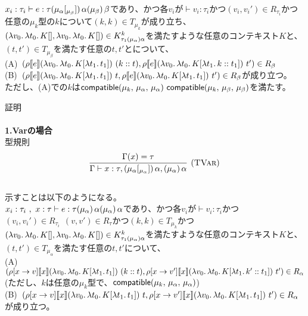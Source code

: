\setcounter{definition}{7}
\begin{theorem}
  $x_i:\tau_i \vdash e:\tau (\mu_{\alpha}\lbrack \tiny{_{\mu_{\beta}}} \rbrack)\,\alpha (\mu_{\beta})\,\beta$であり、かつ各$v_i$が$\vdash v_i:\tau_i$かつ$(v_i,v_i') \in R_{\tau_i}$かつ任意の$\mu_k$型の$k$について$(k,k)\in T_{\mu_k}$が成り立ち、$(\lambda{v_0}.\,{\lambda{t_0}.\,{K[]}}, \lambda{v_0}.\,{\lambda{t_0}.\,{K[]}})\in  K^k_{\tau_1(\mu_{\alpha})\alpha}$を満たすような任意のコンテキスト$K$と、$(t, t') \in T_{\mu_{\beta}}$を満たす任意の$t, t'$とについて、\\
  (A)\ $(\rho [\![{e}]\!] (\lambda{v_0}.\,{\lambda{t_0}.\,{K[\lambda{t_1}.\,{t_1}]}})\ (k::t), \rho [\![{e}]\!] (\lambda{v_0}.\,{\lambda{t_0}.\,{K[\lambda{t_1}.\,{k::t_1}]}})\ t')\in R_{\beta}$\\
  (B)\ $(\rho [\![{e}]\!] (\lambda{v_0}.\,{\lambda{t_0}.\,{K[\lambda{t_1}.\,{t_1}]}})\ t, \rho [\![{e}]\!] (\lambda{v_0}.\,{\lambda{t_0}.\,{K[\lambda{t_1}.\,{t_1}]}})\ t')\in R_{\beta}$が成り立つ。\\
  ただし、(A)での$k$は$\Compatible{\mu_k}{\mu_{\alpha}}{\mu_{\alpha}}\ \Compatible{\mu_k}{\mu_{\beta}}{\mu_{\beta}}$を満たす。\\
\end{theorem}
\lbrack 証明 \rbrack\\\\
\textbf{1.Varの場合}\\
型規則
\[
\begin{array}{c}
\infer[\TVar]
      {\JudgeTrail{\Gamma}{x}{\tau}{\TrailsType{\alpha}{\alpha}}
                                   {\TrailType{\alpha}}}
      {\Gamma(x)=\tau}
\end{array}
\]
\\
示すことは以下のようになる。\\
$x_i:\tau_i\ ,\ x:\tau\vdash e:\tau (\mu_{\alpha})\,\alpha (\mu_{\alpha})\,\alpha$であり、かつ各$v_i$が$\vdash v_i:\tau_i$かつ$(v_i,v_i') \in R_{\tau_i}\ \ (v,v')\in R_{\tau}$かつ$(k,k)\in T_{\mu_k}$かつ$(\lambda{v_0}.\,{\lambda{t_0}.\,{K[]}}, \lambda{v_0}.\,{\lambda{t_0}.\,{K[]}})\in  K^k_{\tau_1(\mu_{\alpha})\alpha}$を満たすような任意のコンテキスト$K$と、$(t, t') \in T_{\mu_{\alpha}}$を満たす任意の$t, t'$について、\\
(A)\ $(\rho[x \rightarrow v] [\![{x}]\!] (\lambda{v_0}.\,{\lambda{t_0}.\,{K[\lambda{t_1}.\,{t_1}]}})\ (k::t), \rho[x \rightarrow v'] [\![{x}]\!] (\lambda{v_0}.\,{\lambda{t_0}.\,{K[\lambda{t_1}.\,{k'::t_1}]}})\ t')\in R_{\alpha}$\\
(ただし、$k$は任意の$\mu_k$型で、$\textsf{compatible}(\mu_k,\,\mu_{\alpha},\,\mu_{\alpha})$)\\
  (B)\ $(\rho[x \rightarrow v] [\![{x}]\!] (\lambda{v_0}.\,{\lambda{t_0}.\,{K[\lambda{t_1}.\,{t_1}]}})\ t, \rho[x \rightarrow v'] [\![{x}]\!] (\lambda{v_0}.\,{\lambda{t_0}.\,{K[\lambda{t_1}.\,{t_1}]}})\ t')\in R_{\alpha}$が成り立つ。\\
